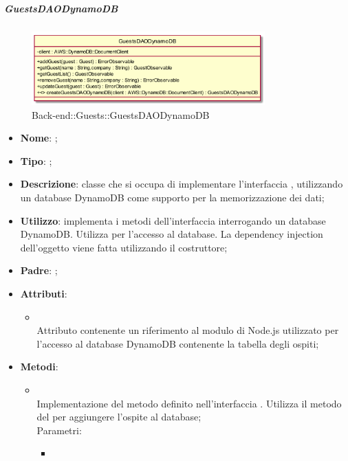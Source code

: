 \hypertarget{GuestsDAODynamoDB_label}{\subparagraph{GuestsDAODynamoDB}}
\begin{figure}[h]
	\centering
	\includegraphics[width=0.80\textwidth,height=\textheight,keepaspectratio]{images/ClassGuestsDAODynamoDB.png}
	\caption{Back-end::Guests::GuestsDAODynamoDB}
\end{figure}
\begin{itemize}
	\item \textbf{Nome}: ;
	\item \textbf{Tipo}: ;
	\item \textbf{Descrizione}: classe che si occupa di implementare l'interfaccia , utilizzando un database DynamoDB come supporto per la memorizzazione dei dati;
	\item \textbf{Utilizzo}: implementa i metodi dell'interfaccia  interrogando un database DynamoDB. Utilizza  per l'accesso al database. La dependency injection dell'oggetto  viene fatta utilizzando il costruttore;
	\item \textbf{Padre}: ;
	\item \textbf{Attributi}:
	\begin{itemize}
		\item[]  \\
		Attributo contenente un riferimento al modulo di Node.js utilizzato per l'accesso al database DynamoDB contenente la tabella degli ospiti;
	\end{itemize}
	\item \textbf{Metodi}:
	\begin{itemize}
		\item[]  \\		Implementazione del metodo definito nell'interfaccia . Utilizza il metodo  del  per aggiungere l'ospite al database;\\
		Parametri:
		\begin{itemize}
			\item {} \\

\end{itemize}
\end{itemize}
\end{itemize}
